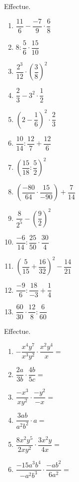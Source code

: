 \documentclass[12pt,parskip=half-, twoside=semi]{scrartcl}
\begin{document}
  \setcounter{exercise}{0}

  \begin{exercise}
    Effectue.
    \begin{enumerate}[cols=3]  
      \item $\dfrac{11}{6} - \dfrac{-7}{9}\cdot\dfrac{6}{8}$
      \item $8 :\dfrac{5}{6}\cdot \dfrac{15}{10}$
      \item $\dfrac{2^3}{12}\cdot\left(\dfrac{3}{8}\right)^2$     
      \item $\dfrac{2}{3}-3^2\cdot\dfrac{1}{2}$
      \item $\left(2-\dfrac{1}{6}\right)^2 \cdot \dfrac{2}{3}$
      \item $\dfrac{10}{14}:\dfrac{12}{7} + \dfrac{12}{6}$
      \item $\left(\dfrac{15}{18}:\dfrac{5}{2}\right)^2$
      \item $\left(\dfrac{-80}{64} \cdot \dfrac{15}{-90}\right) + \dfrac{7}{14} $
      \item $\dfrac{8}{2^5} - \left(\dfrac{9}{2}\right)^2$
      \item $\dfrac{-6}{14} : \dfrac{25}{50} \cdot \dfrac{30}{4}$
      \item $\left(\dfrac{5}{15} + \dfrac{16}{32}\right)^2 - \dfrac{14}{21}$
      \item $\dfrac{-9}{6} : \dfrac{18}{-3}+\dfrac{1}{4}$
      \item $\dfrac{60}{30} \cdot \dfrac{12}{8} : \dfrac{6}{60}$
    \end{enumerate}
  \end{exercise}

  \begin{exercise}
    Effectue.
    \begin{enumerate}[cols=2]
      \item  $-\dfrac{x^4y^7}{x^3y^2} \cdot \dfrac{x^2y^4}{x}=$
      \item  $\dfrac{2a}{3b} \cdot \dfrac{4b}{5c}=$
      \item  $\dfrac{-x^3}{xy^2} \cdot \dfrac{-y^2}{-x}=$
      \item  $\dfrac{3ab}{a^2b^2} \cdot a=$
      \item  $\dfrac{8x^2y^5}{2xy^2} \cdot \dfrac{3x^2y}{4x}=$
      \item  $\dfrac{-15a^3b^4}{-a^2b^3} \cdot \dfrac{-ab^2}{6a^2}=$
    \end{enumerate}
  \end{exercise}

  \newpage
\end{document}
